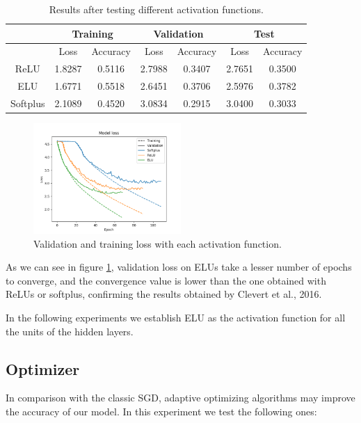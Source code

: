 \documentclass[]{article}
\begin{document}
\begin{table}[H]
	\centering
	\label{t:act}
	\begin{tabular}{@{}ccccccc@{}}
		\toprule
		& \multicolumn{2}{c}{Training} & \multicolumn{2}{c}{Validation} & \multicolumn{2}{c}{Test} \\ \midrule
		& Loss         & Accuracy      & Loss          & Accuracy       & Loss       & Accuracy    \\
		\midrule
		ReLU     & 1.8287       & 0.5116        & 2.7988        & 0.3407         & 2.7651     & 0.3500      \\
		ELU      & 1.6771       & 0.5518        & 2.6451        & 0.3706         & 2.5976     & 0.3782      \\
		Softplus & 2.1089       & 0.4520        & 3.0834        & 0.2915         & 3.0400     & 0.3033      \\ \bottomrule
	\end{tabular}
	\caption{Results after testing different activation functions.}
\end{table}

\begin{figure}[H]
	\centering
	\includegraphics[width=0.5\textwidth]{activation_loss}
	\caption{Validation and training loss with each activation function.}
	\label{f:act1}
\end{figure}

As we can see in figure \ref{f:act1}, validation loss on ELUs take a lesser number of epochs to converge, and the convergence value is lower than the one obtained with ReLUs or softplus, confirming the results obtained by Clevert et al., 2016.

In the following experiments we establish ELU as the activation function for all the units of the hidden layers.

\subsection{Optimizer}

In comparison with the classic SGD, adaptive optimizing algorithms may improve the accuracy of our model. In this experiment we test the following ones:
\end{document}
